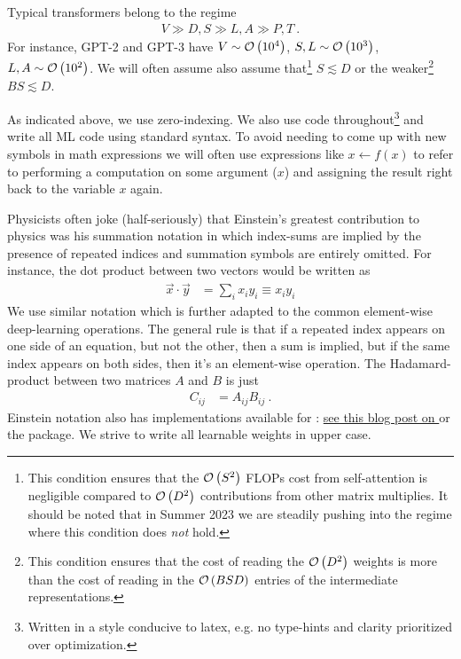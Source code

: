 \documentclass[11pt]{article}
\begin{document}
    Typical
transformers belong to the regime
\begin{gather}
	V \gg D, S \gg L, A \gg P, T \ .  \label{app_eq_transformers_approxs}
\end{gather}
For instance, GPT-2 and GPT-3 \cite{gpt2radford2019language, gpt3brown2020language} have $ V \sim
	\mathcal{O} \left( 10 ^{ 4 } \right)  $, $ S, L \sim \mathcal{O} \left( 10 ^{ 3 } \right)  $, $ L, A \sim \mathcal{O}
	\left( 10 ^{ 2 } \right)  $. We will often assume also assume that\footnote{This condition ensures
	that the $ \mathcal{O} \left( S ^{ 2 } \right)  $ FLOPs cost from self-attention is negligible
	compared to $ \mathcal{O} \left( D ^{ 2 } \right)  $ contributions from other matrix multiplies.  It
	should be noted that in Summer 2023 we are steadily pushing into the regime where this condition
	does \textit{not}  hold.} $ S \lesssim D $ or the weaker\footnote{This condition ensures that the
	cost of reading the $ \mathcal{O} \left( D ^{ 2 } \right)  $ weights is more than the cost of reading in
	the $ \mathcal{O} \left( BSD \right)  $ entries of the intermediate representations.} $ BS \lesssim D $.

As indicated above,  we use zero-indexing. We also use  code
throughout\footnote{Written in a style conducive to latex, e.g. no type-hints and clarity
prioritized over optimization.}  and write all ML code using standard  syntax. To
avoid needing to come up with new symbols in math expressions we will often use expressions like $ x
\leftarrow f(x) $ to refer to performing a computation on some argument ($ x $) and assigning the
result right back to the variable $ x $ again.

Physicists often joke (half-seriously) that Einstein's greatest contribution to physics was his
summation notation in which index-sums are implied by the presence of repeated indices and summation
symbols are entirely omitted. For instance, the dot product between two vectors would be written as
\begin{align}
	\vec{x} \cdot \vec{y} & = \sum _{ i } x _{ i } y _{ i } \equiv x _{ i } y _{  i }
	\label{app_eq_einstein_sum}
\end{align}
We use similar notation which is further adapted to the common element-wise deep-learning
operations.  The general rule is that if a repeated index appears on one side of an equation, but
not the other, then a sum is implied, but if the same index appears on both sides, then it's an
element-wise operation. The Hadamard-product between two matrices $ A $ and $ B $ is just
\begin{align}
	C _{ ij } & = A _{ ij } B _{ ij }\ .
\end{align}
Einstein notation also has implementations available for :
\href{https://rockt.github.io/2018/04/30/einsum}{see this blog post on } or the
\href{https://einops.rocks/1-einops-basics/}{} package.  We strive to write all
learnable weights in upper case.
\end{document}
